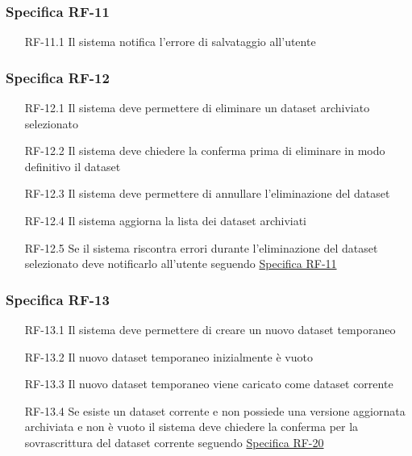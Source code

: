 \subsubsection{Specifica RF-11}
\label{subsubsec:RF-11}
\begin{enumerate}
    \item[RF-11.1] Il sistema notifica l'errore di salvataggio all'utente
\end{enumerate}

\subsubsection{Specifica RF-12}
\label{subsubsec:RF-12}
\begin{enumerate}
    \item[RF-12.1] Il sistema deve permettere di eliminare un dataset archiviato selezionato
    \item[RF-12.2] Il sistema deve chiedere la conferma prima di eliminare in modo definitivo il dataset
    \item[RF-12.3] Il sistema deve permettere di annullare l'eliminazione del dataset
    \item[RF-12.4] Il sistema aggiorna la lista dei dataset archiviati
    \item[RF-12.5] Se il sistema riscontra errori durante l'eliminazione del dataset selezionato deve notificarlo all'utente seguendo \hyperref[subsubsec:RF-11]{Specifica RF-11}
\end{enumerate}


\subsubsection{Specifica RF-13}
\label{subsubsec:RF-13}
\begin{enumerate}
    \item[RF-13.1] Il sistema deve permettere di creare un nuovo dataset temporaneo
    \item[RF-13.2] Il nuovo dataset temporaneo inizialmente è vuoto
    \item[RF-13.3] Il nuovo dataset temporaneo viene caricato come dataset corrente
    \item[RF-13.4] Se esiste un dataset corrente e non possiede una versione aggiornata archiviata e non è vuoto il sistema deve chiedere
    la conferma per la sovrascrittura del dataset corrente seguendo \hyperref[subsubsec:RF-20]{Specifica RF-20}
\end{enumerate}

